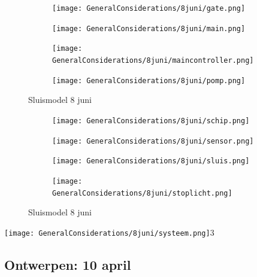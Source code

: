 \documentclass{article}
\begin{document}
	
	
	
	\begin{figure}
		\centering
		\begin{subfigure}{0.45\linewidth}
			\texttt{[image: GeneralConsiderations/8juni/gate.png]}
			\caption{}
			\label{fig:1a}
		\end{subfigure}\hfill
		\begin{subfigure}{0.45\linewidth}
			\texttt{[image: GeneralConsiderations/8juni/main.png]}
			\caption{}
			\label{fig:1a}
		\end{subfigure}
		
		\begin{subfigure}{0.45\linewidth}
			\texttt{[image: GeneralConsiderations/8juni/maincontroller.png]}
			\caption{}
			\label{fig:1a}
		\end{subfigure}\hfill
		\begin{subfigure}{0.45\linewidth}
			\texttt{[image: GeneralConsiderations/8juni/pomp.png]}
			\caption{}
			\label{fig:1a}
		\end{subfigure}
		\caption{Sluismodel 8 juni}
		\label{fig:1}
	\end{figure}
	
	
	
	
	\begin{figure}
		\centering
		\begin{subfigure}{0.45\linewidth}
			\texttt{[image: GeneralConsiderations/8juni/schip.png]}
			\caption{}
			\label{fig:1a}
		\end{subfigure}\hfill
		\begin{subfigure}{0.45\linewidth}
			\texttt{[image: GeneralConsiderations/8juni/sensor.png]}
			\caption{}
			\label{fig:1a}
		\end{subfigure}
		
		\begin{subfigure}{0.45\linewidth}
			\texttt{[image: GeneralConsiderations/8juni/sluis.png]}
			\caption{}
			\label{fig:1a}
		\end{subfigure}\hfill
		\begin{subfigure}{0.45\linewidth}
			\texttt{[image: GeneralConsiderations/8juni/stoplicht.png]}
			\caption{}
			\label{fig:1a}
		\end{subfigure}
		\caption{Sluismodel 8 juni}
		\label{fig:1}
	\end{figure}
	\texttt{[image: GeneralConsiderations/8juni/systeem.png]}3
	\newpage
	\subsection{Ontwerpen: 10 april}
	
\end{document}

